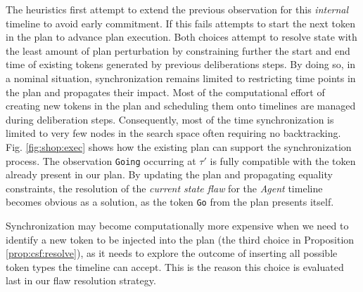 The  heuristics first attempt to extend the
previous observation for this {\em internal} timeline to avoid early
commitment. If this fails \rx attempts to start the next token in the
plan to advance plan execution. Both choices attempt to resolve state
with the least amount of plan perturbation by constraining further the
start and end time of existing tokens generated by previous
deliberations steps. By doing so, in a nominal situation,
synchronization remains limited to restricting time points in the plan
and propagates their impact. Most of the computational effort of
creating new tokens in the plan and scheduling them onto timelines are
managed during deliberation steps. Consequently, most of the time
synchronization is limited to very few nodes in the \eu search space
often requiring no backtracking. Fig. \ref{fig:shop:exec} shows how
the existing plan can support the synchronization process. The
observation \texttt{Going} occurring at $\tau'$ is fully compatible
with the token already present in our plan. By updating the plan and
propagating equality constraints, the resolution of the {\em current
  state flaw} for the {\em Agent} timeline becomes obvious as a
solution, as the token \texttt{Go} from the plan presents itself.

Synchronization may become computationally more expensive when we need
to identify a new token to be injected into the plan (the third choice
in Proposition \ref{prop:csf:resolve}), as it needs to explore the
outcome of inserting all possible token types the timeline can accept.
This is the reason this choice is evaluated last in our flaw
resolution strategy.



